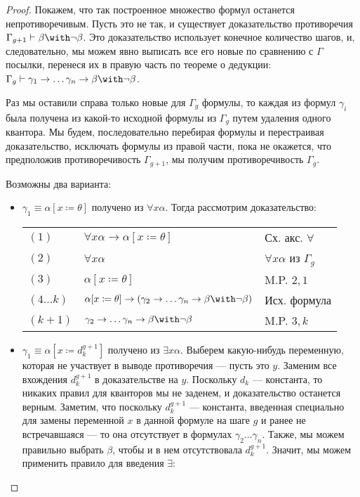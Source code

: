\begin{proof}
Покажем, что так построенное множество формул останется
непротиворечивым. Пусть это не так, и существует доказательство
противоречия $\Gamma_{g+1} \vdash \beta \with \neg\beta$. Это доказательство
использует конечное количество шагов, и, следовательно, мы можем явно
выписать все его новые по сравнению с $\Gamma$ посылки, 
перенеся их в правую часть по теореме о
дедукции: $\Gamma_g \vdash \gamma_1 \rightarrow \dots \gamma_n \rightarrow \beta \with \neg\beta$.

Раз мы оставили справа только новые для $\Gamma_g$ формулы,
то каждая из формул $\gamma_i$ была получена из какой-то исходной формулы 
из $\Gamma_g$ путем удаления одного квантора. Мы будем, последовательно перебирая
формулы и перестраивая доказательство,
исключать формулы из правой части, пока не окажется, что предположив противоречивость
$\Gamma_{g+1}$, мы получим противоречивость $\Gamma_g$.

Возможны два варианта:
\begin{itemize}
\item $\gamma_1 \equiv \alpha[x \coloneqq  \theta]$ 
получено из $\forall x \alpha$. Тогда рассмотрим доказательство:

\begin{tabular}{lll}
$(1)$ & $\forall x \alpha \rightarrow \alpha [x \coloneqq  \theta]$ & Сх. акс. $\forall$\\
$(2)$ & $\forall x \alpha$ & $\forall x \alpha$ из $\Gamma_g$\\
$(3)$ & $\alpha [x \coloneqq  \theta]$ & M.P. $2,1$\\
$(4 \dots k)$ & $\alpha [x \coloneqq  \theta] \rightarrow (\gamma_2 \rightarrow \dots \gamma_n \rightarrow \beta \with \neg \beta)$ & Исх. формула\\
$(k+1)$ & $\gamma_2 \rightarrow \dots \gamma_n \rightarrow \beta \with \neg \beta$ & M.P. $3,k$
\end{tabular}

\item $\gamma_1 \equiv \alpha[x \coloneqq  d_k^{g+1}]$ получено из $\exists x \alpha$.
Выберем какую-нибудь переменную, которая не участвует в выводе противоречия --- пусть это $y$.
Заменим все вхождения $d_k^{g+1}$ в доказательстве на $y$. Поскольку
$d_k$ --- константа, то никаких правил для кванторов мы не заденем, и доказательство
останется верным.
Заметим, что поскольку $d_k^{g+1}$ --- константа, введенная специально для замены 
переменной $x$ в данной формуле на шаге $g$
и ранее не встречавшаяся --- то она отсутствует в формулах $\gamma_2 \dots \gamma_n$.
Также, мы можем правильно выбрать $\beta$, чтобы и в нем отсутствовала $d_k^{g+1}$.
Значит, мы можем применить правило для введения $\exists$:


\end{itemize}
\end{proof}

